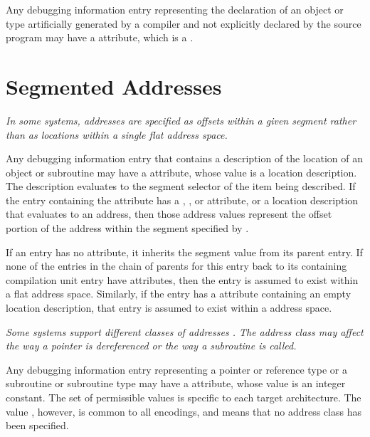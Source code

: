 Any debugging information entry representing the
declaration of an object or type artificially generated by
a compiler and not explicitly declared by the source program
\hypertarget{chap:DWATartificialobjectsortypesthat}{}
may have a 
\DWATartificial{} attribute, 
which is a .

\section{Segmented Addresses}
\label{chap:segmentedaddresses}
\textit{In some systems, addresses are specified as offsets within a
given 
segment 
rather than as locations within a single flat
address space.}

Any debugging information entry that contains a description
\hypertarget{chap:DWATsegmentaddressinginformation}{}
of the location of an object or subroutine may have a 
\DWATsegment{} attribute, 
whose value is a location
description. The description evaluates to the segment selector
of the item being described. If the entry containing the
\DWATsegment{} attribute has a 
\DWATlowpc, 
\DWAThighpc,
\DWATranges{} or 
\DWATentrypc{} attribute, 
or 
a location
description that evaluates to an address, then those address
values represent the offset portion of the address within
the segment specified 
by \DWATsegment.

If an entry has no 
\DWATsegment{} attribute, it inherits
the segment value from its parent entry.  If none of the
entries in the chain of parents for this entry back to
its containing compilation unit entry have 
\DWATsegment{} attributes, 
then the entry is assumed to exist within a flat
address space. 
Similarly, if the entry has a 
\DWATsegment{} attribute 
containing an empty location description, that
entry is assumed to exist within a 
address space.

\textit{Some systems support different classes of 
addresses
. 
The
address class may affect the way a pointer is dereferenced
or the way a subroutine is called.}


Any debugging information entry representing a pointer or
reference type or a subroutine or subroutine type may 
have a 
\DWATaddressclass{}
attribute, whose value is an integer
constant.  The set of permissible values is specific to
each target architecture. The value \DWADDRnoneTARG, 
however,
is common to all encodings, and means that no address class
has been specified.

